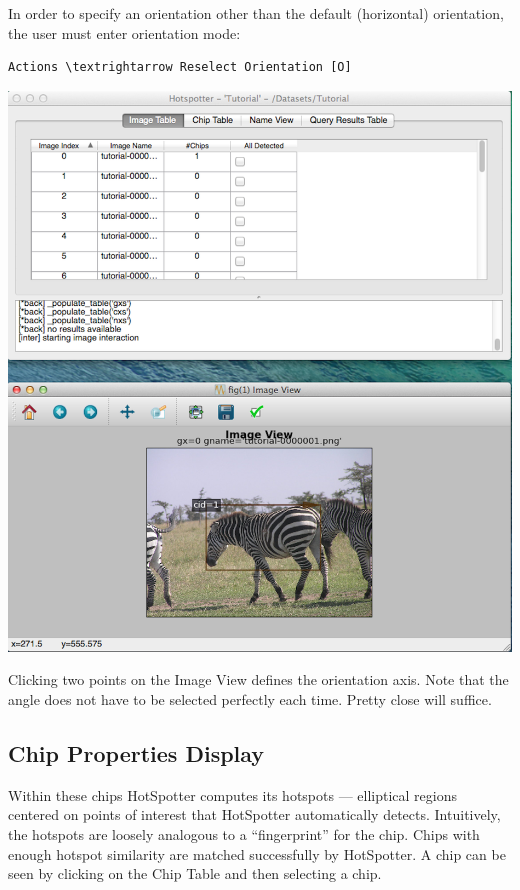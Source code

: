 \documentclass[a4paper,10pt]{article}
\begin{document}
        In order to specify an orientation other than the default
        (horizontal) orientation, the user must enter orientation
        mode:
        \begin{Verbatim}[commandchars=\\\{\}]
        Actions \textrightarrow Reselect Orientation [O]
        \end{Verbatim}
        \begin{center}
            \includegraphics[scale=0.13]{images/image.png}
        \end{center}

        \noindent
        Clicking two points on the Image View defines the orientation axis.
        Note that the angle does not have to be selected perfectly each time. Pretty close will suffice.

    \subsection{Chip Properties Display} 
        Within these chips HotSpotter computes its hotspots --- elliptical
        regions centered on points of interest that HotSpotter automatically
        detects.  Intuitively, the hotspots are loosely analogous to a
        ``fingerprint'' for the chip.  Chips with enough hotspot similarity
        are matched successfully by HotSpotter. A chip can be seen by clicking 
	on the Chip Table and then selecting a chip.
\end{document}
